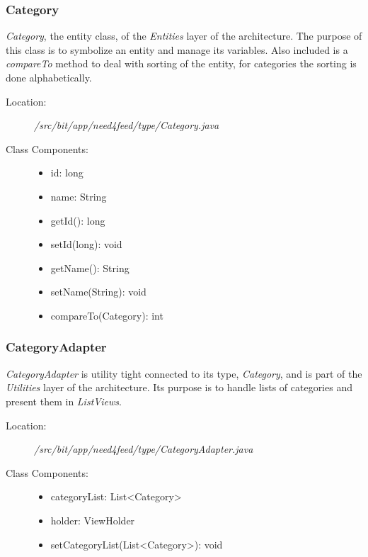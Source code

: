 \subsubsection{Category}
\textit{Category}, the entity class, of the \textit{Entities} layer of the architecture. The purpose of this class is to symbolize an entity and manage its variables. Also included is a \textit{compareTo} method to deal with sorting of the entity, for categories the sorting is done alphabetically.
\begin{description}
  \item[Location:] \textit{/src/bit/app/need4feed/type/Category.java} \hfill
  \item[Class Components:] \hfill
     \begin{itemize}
        \item id: long
        \item name: String
		\item getId(): long 
		\item setId(long): void
		\item getName(): String 
		\item setName(String): void
		\item compareTo(Category): int
     \end{itemize}
\end{description}


\subsubsection{CategoryAdapter}
\textit{CategoryAdapter} is utility tight connected to its type, \textit{Category}, and is part of the \textit{Utilities} layer of the architecture. Its purpose is to handle lists of categories and present them in \textit{ListViews}.
\begin{description}
  \item[Location:] \textit{/src/bit/app/need4feed/type/CategoryAdapter.java} \hfill
  \item[Class Components:] \hfill
     \begin{itemize}
        \item categoryList: List\textless Category\textgreater
        \item holder: ViewHolder
		\item setCategoryList(List\textless Category\textgreater): void 
     \end{itemize}
\end{description}


